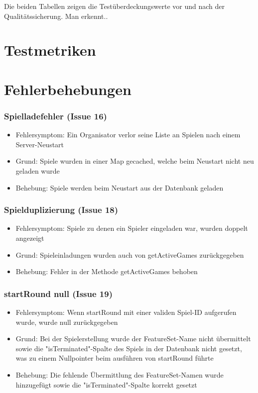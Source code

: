 \documentclass[a4paper]{scrreprt}
\begin{document}
    Die beiden Tabellen zeigen die Testüberdeckungswerte vor und nach der Qualitätssicherung. Man erkennt..



    \chapter{Testmetriken}



    \chapter{Fehlerbehebungen}

    \subsection{Spielladefehler (Issue 16)}
    \begin{itemize}
        \item Fehlersymptom: Ein Organisator verlor seine Liste an Spielen nach einem Server-Neustart
        \item Grund: Spiele wurden in einer Map gecached, welche beim Neustart nicht neu geladen wurde
        \item Behebung: Spiele werden beim Neustart aus der Datenbank geladen
    \end{itemize}
    \subsection{Spielduplizierung (Issue 18)}
    \begin{itemize}
        \item Fehlersymptom: Spiele zu denen ein Spieler eingeladen war, wurden doppelt angezeigt
        \item Grund: Spieleinladungen wurden auch von getActiveGames zurückgegeben
        \item Behebung: Fehler in der Methode getActiveGames behoben
    \end{itemize}
    \subsection{startRound null (Issue 19)}
    \begin{itemize}
        \item Fehlersymptom: Wenn startRound mit einer validen Spiel-ID aufgerufen wurde, wurde null zurückgegeben
        \item Grund: Bei der Spielerstellung wurde der FeatureSet-Name nicht übermittelt sowie die "isTerminated"-Spalte des Spiels
        in der Datenbank nicht gesetzt, was zu einem Nullpointer beim ausführen von startRound führte
        \item Behebung: Die fehlende Übermittlung des FeatureSet-Namen wurde hinzugefügt sowie die "isTerminated"-Spalte korrekt gesetzt
    \end{itemize}
\end{document}
